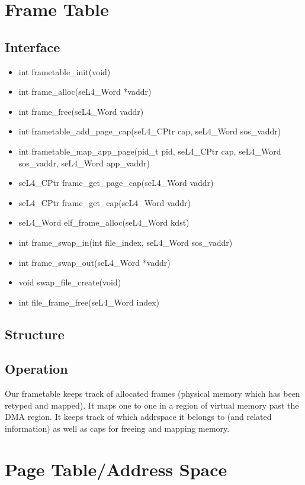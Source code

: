 \documentclass[12pt]{article}
\begin{document}
\clearpage
\section{Frame Table}
\subsection{Interface}
\begin{itemize}
\item int frametable\_init(void)
\item int frame\_alloc(seL4\_Word *vaddr)
\item int frame\_free(seL4\_Word vaddr)
\item int frametable\_add\_page\_cap(seL4\_CPtr cap, seL4\_Word sos\_vaddr)
\item int frametable\_map\_app\_page(pid\_t pid, seL4\_CPtr cap, seL4\_Word sos\_vaddr, seL4\_Word           app\_vaddr)
\item seL4\_CPtr frame\_get\_page\_cap(seL4\_Word vaddr)
\item seL4\_CPtr frame\_get\_cap(seL4\_Word vaddr)
\item seL4\_Word elf\_frame\_alloc(seL4\_Word kdst)
\item int frame\_swap\_in(int file\_index, seL4\_Word sos\_vaddr)
\item int frame\_swap\_out(seL4\_Word *vaddr)
\item void swap\_file\_create(void)
\item int file\_frame\_free(seL4\_Word index)
\end{itemize}
\subsection{Structure}
\subsection{Operation}
Our frametable keeps track of allocated frames (physical memory which has been retyped and mapped). It maps one to one in a region of virtual memory past the DMA region. It keeps track of which addrspace it belongs to (and related information) as well as caps for freeing and mapping memory.

\clearpage
\section{Page Table/Address Space}
\end{document}
